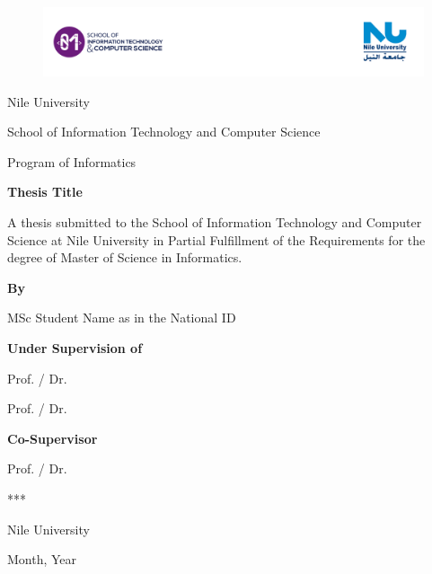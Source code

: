 \documentclass[ms]{osudissert96}
\begin{document}
\thispagestyle{empty}

\begin{figure}
    \centering
    \includegraphics[width=1\linewidth]{images/header_logo.png}
\end{figure}
\begin{center}

Nile University

School of Information Technology and Computer Science

Program of Informatics

\vspace{\baselineskip}
{\Large \textbf{Thesis Title}}

\vspace{\baselineskip}
A thesis submitted to the School of Information Technology and Computer Science at Nile University in Partial Fulfillment of the Requirements for the degree of Master of Science in Informatics.

\textbf{By} 

MSc Student Name as in the National ID

\textbf{Under Supervision of}

Prof. / Dr.

Prof. / Dr. 

\textbf{Co-Supervisor}

Prof. / Dr. 

***

Nile University 

Month, Year 
\end{center}

\pagebreak



\pagebreak


\startdoublespace
\begin{abstract}

\end{abstract}
\dedication{To my beloved family}

\acknowledgements{}
\end{document}
